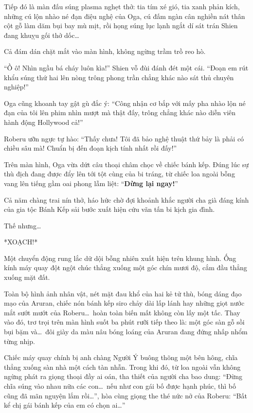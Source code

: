\documentclass[../main.tex]{subfiles}
\begin{document}
Tiếp đó là màn đấu súng plasma nghẹt thở: tia tím xé gió, tia xanh phản kích, những cú lộn nhào né đạn điệu nghệ của Oga, cú đấm ngàn cân nghiền nát thân cột gỗ làm dăm bụi bay mù mịt, rồi họng súng lục lạnh ngắt dí sát trán Shien đang khuỵu gối thở dốc\dots

Cả đám dán chặt mắt vào màn hình, không ngừng trầm trồ reo hò.

``Ồ ô! Nhìn ngầu bá cháy luôn kìa!'' Shien vỗ đùi đánh đét một cái. ``Đoạn em rút khẩu súng thứ hai lên nòng trông phong trần chẳng khác nào sát thủ chuyên nghiệp!''

Oga cũng khoanh tay gật gù đắc ý: ``Công nhận cơ bắp với mấy pha nhào lộn né đạn của tôi lên phim nhìn mượt mà thật đấy, trông chẳng khác nào diễn viên hành động Hollywood cả!''

Roberu ưỡn ngực tự hào: ``Thấy chưa! Tôi đã bảo nghệ thuật thứ bảy là phải có chiều sâu mà! Chuẩn bị đến đoạn kịch tính nhất rồi đấy!''

Trên màn hình, Oga vừa dứt câu thoại châm chọc về chiếc bánh kếp. Đúng lúc sự thù địch đang được đẩy lên tới tột cùng của bi tráng, từ chiếc loa ngoài bỗng vang lên tiếng gầm oai phong lẫm liệt: ``\textbf{Dừng lại ngay!}''

Cả năm chàng trai nín thở, háo hức chờ đợi khoảnh khắc người cha già đáng kính của gia tộc Bánh Kếp sải bước xuất hiện cứu vãn tấn bi kịch gia đình.

Thế nhưng\dots

*XOẠCH!*

Một chuyển động rung lắc dữ dội bỗng nhiên xuất hiện trên khung hình. Ống kính máy quay đột ngột chúc thẳng xuống một góc chín mươi độ, cắm đầu thẳng xuống mặt đất.

Toàn bộ hình ảnh nhân vật, nét mặt đau khổ của hai kẻ tử thù, bóng dáng đạo mạo của Aruran, chiếc nón bánh kếp siro chảy dài lấp lánh hay những giọt nước mắt sướt mướt của Roberu\dots\ hoàn toàn biến mất không còn lấy một tấc. Thay vào đó, trơ trọi trên màn hình suốt ba phút rưỡi tiếp theo là: một góc sàn gỗ sồi bụi bặm và\dots\ đôi giày da màu nâu bóng loáng của Aruran đang đứng nhấp nhổm từng nhịp.


Chiếc máy quay chính bị anh chàng Người Ý buông thõng một bên hông, chĩa thẳng xuống sàn nhà một cách tàn nhẫn. Trong khi đó, từ loa ngoài vẫn không ngừng phát ra giọng thoại đầy ai oán, tha thiết của người cha bao dung: ``Đừng chĩa súng vào nhau nữa các con\dots\ nếu như con gái bố được hạnh phúc, thì bố cũng đã mãn nguyện lắm rồi\dots'', hòa cùng giọng the thé nức nở của Roberu: ``Bất kể chị gái bánh kếp của em có chọn ai\dots''
\end{document}
